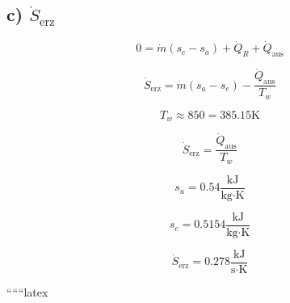 \subsection*{c) $\dot{S}_{\text{erz}}$}

\[
0 = \dot{m} (s_c - s_a) + \dot{Q}_R + \dot{Q}_{\text{aus}}
\]

\[
\dot{S}_{\text{erz}} = \dot{m} (s_a - s_e) - \frac{\dot{Q}_{\text{aus}}}{T_w}
\]

\[
T_w \approx 850 = 385.15 \text{K}
\]

\[
\dot{S}_{\text{erz}} = \frac{\dot{Q}_{\text{aus}}}{T_w}
\]

\[
s_a = 0.54 \frac{\text{kJ}}{\text{kg} \cdot \text{K}}
\]

\[
s_e = 0.5154 \frac{\text{kJ}}{\text{kg} \cdot \text{K}}
\]

\[
\dot{S}_{\text{erz}} = 0.278 \frac{\text{kJ}}{\text{s} \cdot \text{K}}
\]

``````latex